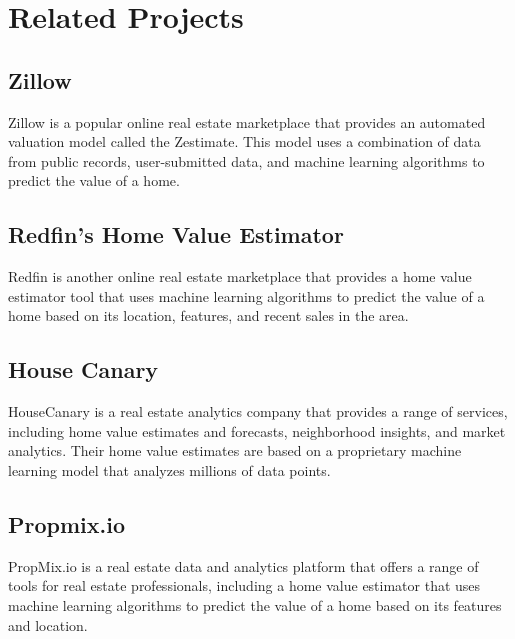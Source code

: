 \section{Related Projects}
\vspace{-18pt}
\subsection{Zillow}
\vspace{-18pt}
 Zillow is a popular online real estate marketplace that provides an automated valuation model called the Zestimate. This model uses a combination of data from public records, user-submitted data, and machine learning algorithms to predict the value of a home.
 \vspace{-10pt}
\subsection{Redfin's Home Value Estimator}
\vspace{-18pt}
Redfin is another online real estate marketplace that provides a home value estimator tool that uses machine learning algorithms to predict the value of a home based on its location, features, and recent sales in the area.
\vspace{-10pt}
\subsection{House Canary}
\vspace{-18pt}
HouseCanary is a real estate analytics company that provides a range of services, including home value estimates and forecasts, neighborhood insights, and market analytics. Their home value estimates are based on a proprietary machine learning model that analyzes millions of data points.
\vspace{-10pt}
\subsection{Propmix.io}
\vspace{-18pt}
PropMix.io is a real estate data and analytics platform that offers a range of tools for real estate professionals, including a home value estimator that uses machine learning algorithms to predict the value of a home based on its features and location.
\vspace{-10pt}
